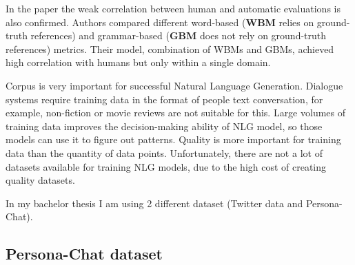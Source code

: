 In the paper \cite{novikova2017we} the weak correlation between human and automatic evaluations is also confirmed. Authors compared different word-based (\textbf{WBM} relies on ground-truth references) and grammar-based (\textbf{GBM} does not rely on ground-truth references) metrics. Their model, combination of WBMs and GBMs, achieved high correlation with humans but only within a single domain.

Corpus is very important for successful Natural Language Generation. Dialogue systems require training data in the format of people text conversation, for example, non-fiction or movie reviews are not suitable for this. Large volumes of training data improves the decision-making ability of NLG model, so those models can use it to figure out patterns. Quality is more important for training data than the quantity of data points. Unfortunately, there are not a lot of datasets available for training NLG models, due to the high cost of creating quality datasets. 

In my bachelor thesis I am using 2 different dataset (Twitter data and Persona-Chat). 

\subsection{Persona-Chat dataset} \label{persona_chat_subsec}

